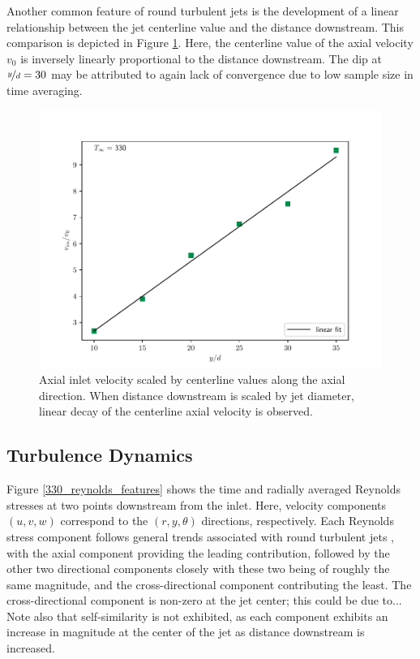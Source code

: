 Another common feature of round turbulent jets is the development of a linear relationship between the jet centerline value and the distance downstream. This comparison is depicted in Figure \ref{330_centerline_scaling}. Here, the centerline value of the axial velocity $v_0$ is inversely linearly proportional to the distance downstream. The dip at $\nicefrac{y}{d}=30$ may be attributed to again lack of convergence due to low sample size in time averaging. 

\begin{figure}[H]
\begin{center}
	\includegraphics[scale=.7]{figures/Plots/radial/slices_5/same_ambient/uin_u0_vs_x_d.pdf}
	\caption{Axial inlet velocity scaled by centerline values along the axial direction. When distance downstream is scaled by jet diameter, linear decay of the centerline axial velocity is observed.} \label{330_centerline_scaling}
\end{center}
\end{figure}

\subsection{Turbulence Dynamics}
Figure \ref{330_reynolds_features} shows the time and radially averaged Reynolds stresses at two points downstream from the inlet. Here, velocity components $(u,v,w)$ correspond to the $(r,y,\theta)$ directions, respectively. Each Reynolds stress component follows general trends associated with round turbulent jets \cite{Pope}, with the axial component providing the leading contribution, followed by the other two directional components closely with these two being of roughly the same magnitude, and the cross-directional component contributing the least. The cross-directional component is non-zero at the jet center; this could be due to... Note also that self-similarity is not exhibited, as each component exhibits an increase in magnitude at the center of the jet as distance downstream is increased. 

